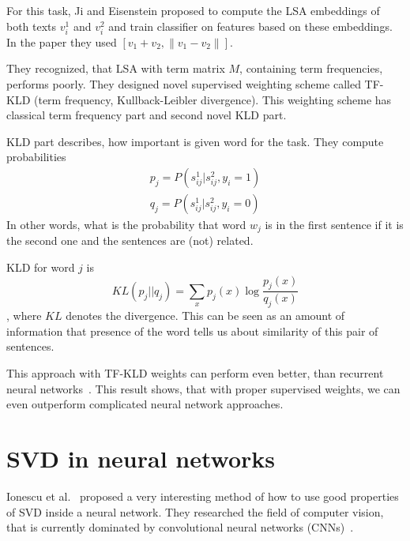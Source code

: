         For this task, Ji and Eisenstein proposed to compute the LSA embeddings of both texts $v_i^1$ and $v_i^2$ and train classifier on features based on these embeddings.
        In the paper they used $[v_1 + v_2, \| v_1- v_2 \|]$.
        
        They recognized, that LSA with term matrix $M$, containing term frequencies, performs poorly. 
        They designed novel supervised weighting scheme called TF-KLD (term frequency, Kullback-Leibler divergence). 
        This weighting scheme has classical term frequency part and second novel KLD part.
        
        KLD part describes, how important is given word for the task.
        They compute probabilities 
        \begin{equation}
        \begin{split}
        p_j = P(s_{ij}^1| s_{ij}^2, y_i=1) \\
        q_j = P(s_{ij}^1| s_{ij}^2, y_i=0)   
        \end{split}
        \end{equation}
        In other words, what is the probability that word $w_j$ is in the first sentence if it is the second one and the sentences are (not) related.
        
        KLD for word $j$ is 
        \begin{equation}
        KL(p_j || q_j) = \sum_x p_j(x) \log \frac{p_j(x)}{q_j(x)}
        \end{equation},
         where $KL$ denotes the  divergence.
        This can be seen as an amount of information that presence of the word tells us about similarity of this pair of sentences. 
    
        This approach with TF-KLD weights can perform even better, than recurrent neural networks~\cite{conneau2017supervised}.
        This result shows, that with proper supervised weights, we can even outperform complicated neural network approaches.
        

\section{SVD in neural networks} \label{sec:nn:svd}
    Ionescu et al.~\cite{ionescu2015training} %
    proposed a very interesting method of how to use good properties of SVD inside a neural network.
    They researched the field of computer vision, that is currently dominated by convolutional neural networks (CNNs)~\cite{lecun1998}.
    
